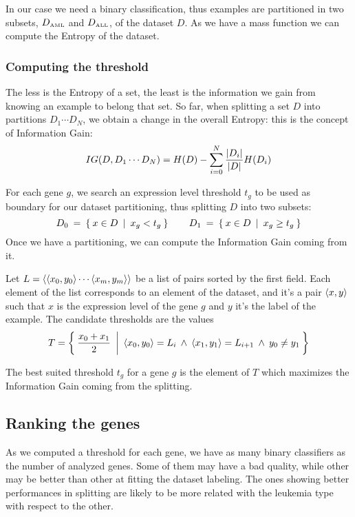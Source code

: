         In our case we need a binary classification, thus examples are
        partitioned in two subsets, $D_{\tiny{\mbox{AML}}}$ and
        $D_{\tiny{\mbox{ALL}}}$, of the dataset $D$. As we have a mass function
        we can compute the Entropy of the dataset.

    \subsubsection{ Computing the threshold }

        The less is the Entropy of a set, the least is the information we
        gain from knowing an example to belong that set. So far, when
        splitting a set $D$ into partitions $D_1 \cdots D_N$, we obtain a
        change in the overall Entropy: this is the concept of Information
        Gain:
        \[
        IG(D, D_1 \cdots D_N) =
            H(D) - \sum_{i = 0}^N \frac{ \left|{D_i}\right| }{ \left|{D}\right| } H(D_i)
        \]

        For each gene $g$, we search an expression level threshold $t_g$
        to be used as boundary for our dataset partitioning, thus
        splitting $D$ into two subsets:
        \[
        D_0 \:=\: \Set{ x \in D \:|\: x_g < t_g }
        \qquad
        D_1 \:=\: \Set{ x \in D \:|\: x_g \geq t_g }
        \]
        Once we have a partitioning, we can compute the Information Gain
        coming from it.

        Let $L = \left \langle {\ensuremath{\left \langle {x_0, y_0} \right \rangle } \cdots \ensuremath{\left \langle {x_m, y_m} \right \rangle }} \right \rangle $ be a
        list of pairs sorted by the first field. Each element of the list
        corresponds to an element of the dataset, and it's a pair
        $\left \langle {x,y} \right \rangle $ such that $x$ is the expression level of the gene
        $g$ and $y$ it's the label of the example. The candidate
        thresholds are the values
        \[
        T = \Set{ \frac{x_0 + x_1}{2} \:|\:
                  \ensuremath{\left \langle {x_0, y_0} \right \rangle } = L_i \:\land\:
                  \ensuremath{\left \langle {x_1, y_1} \right \rangle } = L_{i + 1} \:\land\:
                  y_0 \neq y_1 }
        \]

        The best suited threshold $t_g$ for a gene $g$ is the element of
        $T$ which maximizes the Information Gain coming from the splitting.

    \subsection{ Ranking the genes }

        As we computed a threshold for each gene, we have as many binary
        classifiers as the number of analyzed genes. Some of them may
        have a bad quality, while other may be better than other at
        fitting the dataset labeling. The ones showing better performances
        in splitting are likely to be more related with the leukemia type
        with respect to the other.

